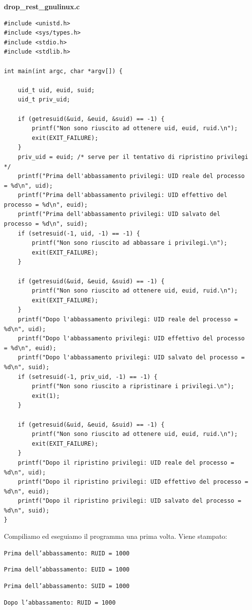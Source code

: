 \begin{mdframed}[backgroundcolor=white!20,shadow=false]
\textbf{drop\_rest\_gnulinux.c}
\begin{verbatim}
#include <unistd.h>
#include <sys/types.h>
#include <stdio.h>
#include <stdlib.h>

int main(int argc, char *argv[]) {

	uid_t uid, euid, suid;
	uid_t priv_uid;

	if (getresuid(&uid, &euid, &suid) == -1) {
		printf("Non sono riuscito ad ottenere uid, euid, ruid.\n");
		exit(EXIT_FAILURE);
	}
	priv_uid = euid; /* serve per il tentativo di ripristino privilegi */
	printf("Prima dell'abbassamento privilegi: UID reale del processo = %d\n", uid);
	printf("Prima dell'abbassamento privilegi: UID effettivo del processo = %d\n", euid);
	printf("Prima dell'abbassamento privilegi: UID salvato del processo = %d\n", suid);
	if (setresuid(-1, uid, -1) == -1) {
		printf("Non sono riuscito ad abbassare i privilegi.\n");
		exit(EXIT_FAILURE);
	}

	if (getresuid(&uid, &euid, &suid) == -1) {
		printf("Non sono riuscito ad ottenere uid, euid, ruid.\n");
		exit(EXIT_FAILURE);
	}
	printf("Dopo l'abbassamento privilegi: UID reale del processo = %d\n", uid);
	printf("Dopo l'abbassamento privilegi: UID effettivo del processo = %d\n", euid);
	printf("Dopo l'abbassamento privilegi: UID salvato del processo = %d\n", suid);
	if (setresuid(-1, priv_uid, -1) == -1) {
		printf("Non sono riuscito a ripristinare i privilegi.\n");
		exit(1);
	}

	if (getresuid(&uid, &euid, &suid) == -1) {
		printf("Non sono riuscito ad ottenere uid, euid, ruid.\n");
		exit(EXIT_FAILURE);
	}
	printf("Dopo il ripristino privilegi: UID reale del processo = %d\n", uid);
	printf("Dopo il ripristino privilegi: UID effettivo del processo = %d\n", euid);
	printf("Dopo il ripristino privilegi: UID salvato del processo = %d\n", suid);
}

\end{verbatim}
\end{mdframed}
Compiliamo ed eseguiamo il programma una prima volta. Viene stampato:

\texttt{Prima dell’abbassamento: RUID = 1000}

\texttt{Prima dell’abbassamento: EUID = 1000}

\texttt{Prima dell’abbassamento: SUID = 1000}

\texttt{Dopo l’abbassamento: RUID = 1000}


